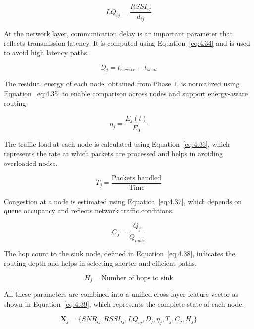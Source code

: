 \documentclass[a4paper,fleqn]{cas-dc}
\numberwithin{equation}{section}
\begin{document}
\begin{equation}
LQ_{ij} = \frac{RSSI_{ij}}{d_{ij}}
\label{eq:4.33}
\end{equation}

At the network layer, communication delay is an important parameter that reflects transmission latency. It is computed using Equation~\ref{eq:4.34} and is used to avoid high latency paths.

\begin{equation}
D_j = t_{receive} - t_{send}
\label{eq:4.34}
\end{equation}

The residual energy of each node, obtained from Phase 1, is normalized using Equation~\ref{eq:4.35} to enable comparison across nodes and support energy-aware routing.

\begin{equation}
\eta_j = \frac{E_j(t)}{E_0}
\label{eq:4.35}
\end{equation}

The traffic load at each node is calculated using Equation~\ref{eq:4.36}, which represents the rate at which packets are processed and helps in avoiding overloaded nodes.

\begin{equation}
T_j = \frac{\text{Packets handled}}{\text{Time}}
\label{eq:4.36}
\end{equation}

Congestion at a node is estimated using Equation~\ref{eq:4.37}, which depends on queue occupancy and reflects network traffic conditions.

\begin{equation}
C_j = \frac{Q_j}{Q_{max}}
\label{eq:4.37}
\end{equation}

The hop count to the sink node, defined in Equation~\ref{eq:4.38}, indicates the routing depth and helps in selecting shorter and efficient paths.

\begin{equation}
H_j = \text{Number of hops to sink}
\label{eq:4.38}
\end{equation}

All these parameters are combined into a unified cross layer feature vector as shown in Equation~\ref{eq:4.39}, which represents the complete state of each node.

\begin{equation}
\mathbf{X}_j = \{SNR_{ij}, RSSI_{ij}, LQ_{ij}, D_j, \eta_j, T_j, C_j, H_j\}
\label{eq:4.39}
\end{equation}
\end{document}
